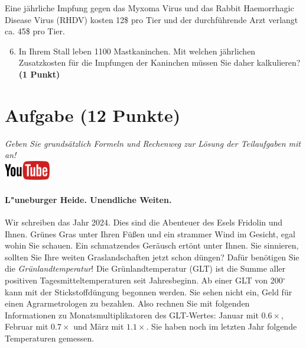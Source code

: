 \documentclass[a4paper, 9pt]{scrartcl}\usepackage[]{graphicx}\usepackage[]{xcolor}
\begin{document}
Eine j{\"a}hrliche Impfung gegen das Myxoma Virus und das Rabbit Haemorrhagic
Disease Virus (RHDV) kosten 12\$ pro Tier und der
durchf{\"u}hrende Arzt verlangt ca. 45\$ pro Tier.

\begin{enumerate}
  \setcounter{enumi}{5}
\item In Ihrem Stall leben 1100 Mastkaninchen. Mit welchen
  j{\"a}hrlichen Zusatzkosten f{\"u}r die Impfungen der Kaninchen m{\"u}ssen Sie daher
  kalkulieren? \textbf{(1 Punkt)}
\end{enumerate}
 
\clearpage

\section{Aufgabe \hfill (12 Punkte)}

\textit{Geben Sie grunds{\"a}tzlich Formeln und Rechenweg zur L{\"o}sung der
  Teilaufgaben mit an!} \\[1Ex]

\hfill\href{https://youtu.be/fiWGgCX-cE4}{\includegraphics[width =
  2cm]{img/youtube}} %
\hspace{2Ex}



\paragraph{L{"u}neburger Heide. Unendliche Weiten.}



Wir schreiben das Jahr 2024. Dies sind die Abenteuer
des Esels Fridolin und Ihnen. Gr{\"u}nes Gras unter Ihren F{\"u}{\ss}en und
ein strammer Wind im Gesicht, egal wohin Sie schauen. Ein schmatzendes
Ger{\"a}usch ert{\"o}nt unter Ihnen. Sie sinnieren, sollten Sie Ihre weiten
Graslandschaften jetzt schon d{\"u}ngen?  Daf{\"u}r ben{\"o}tigen Sie die
\textit{Gr{\"u}nlandtemperatur}! Die Gr{\"u}nlandtemperatur (GLT) ist die Summe aller
positiven Tagesmitteltemperaturen seit Jahresbeginn. Ab einer GLT von
200$^\circ$ kann mit der Stickstoffd{\"u}ngung begonnen werden. Sie sehen nicht
ein, Geld f{\"u}r einen Agrarmetrologen zu bezahlen. Also rechnen Sie mit
folgenden Informationen zu Monatsmultiplikatoren des GLT-Wertes: Januar mit
$0.6\times$, Februar mit $0.7\times$ und M{\"a}rz mit
$1.1\times$. Sie haben noch im letzten Jahr folgende Temperaturen
gemessen.
\end{document}
